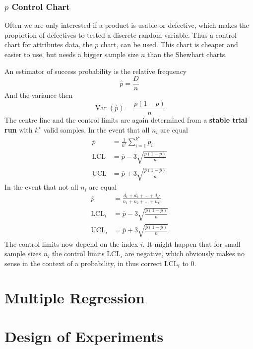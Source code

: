 \documentclass[11pt]{article}
\theoremstyle{definition}
\newcommand*\samplemean[1]{\overline{#1}}
\newcommand*\Var[1]{\mathop{\text{Var}}\left(#1\right)}
\begin{document}
\subsubsection{$p$ Control Chart}
Often we are only interested if a product is usable or defective, which makes the proportion of defectives to tested a discrete random variable. Thus a control chart for attributes data, the $p$ chart, can be used. This chart is cheaper and easier to use, but needs a bigger sample size $n$ than the Shewhart charts.

\vspace{1em}
\noindent
An estimator of success probability is the relative frequency
\begin{equation*}
	\hat{p} = \frac{D}{n}
\end{equation*}
And the variance then
\begin{equation*}
	\Var{\hat{p}} = \frac{p(1-p)}{n}
\end{equation*}
The centre line and the control limits are again determined from a \textbf{stable trial run} with $k^\star$ valid samples. In the event that all $n_i$ are equal
\begin{align*}
	\samplemean{p} &= \frac{1}{k^\star}\sum_{i=1}^{k^\star}p_i\\
	\text{LCL} &= \samplemean{p} - 3 \sqrt{\frac{\samplemean{p}(1-\samplemean{p})}{n}}\\
	\text{UCL} &= \samplemean{p} + 3 \sqrt{\frac{\samplemean{p}(1-\samplemean{p})}{n}}
\end{align*}
In the event that not all $n_i$ are equal
\begin{align*}
	\samplemean{p} &= \frac{d_1 + d_2 + \dots + d_{k^\star}}{n_1 + n_2 + \dots + n_{k^\star}}\\
	\text{LCL}_i &= \samplemean{p} - 3 \sqrt{\frac{\samplemean{p}(1-\samplemean{p})}{n}}\\
	\text{UCL}_i &= \samplemean{p} + 3 \sqrt{\frac{\samplemean{p}(1-\samplemean{p})}{n}}
\end{align*}
The control limits now depend on the index $i$. It might happen that for small sample sizes $n_i$ the control limits $\text{LCL}_i$ are negative, which obviously makes no sense in the context of a probability, in thus correct $\text{LCL}_i$ to $0$.

\section{Multiple Regression}

\section{Design of Experiments}
\end{document}
